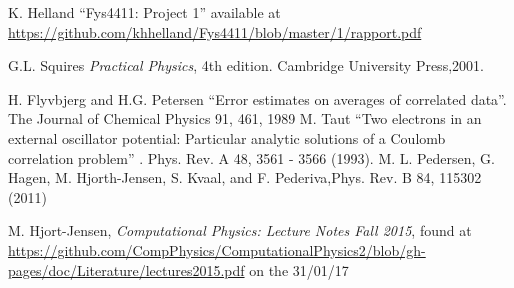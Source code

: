 \documentclass[a4paper,English,10pt]{article}
\begin{document}
\begin{thebibliography}{1}

  K. Helland ``Fys4411: Project 1'' available at \url{https://github.com/khhelland/Fys4411/blob/master/1/rapport.pdf}
  
  G.L. Squires \emph{Practical Physics}, 4th edition. Cambridge University Press,2001.
  
  H. Flyvbjerg and H.G. Petersen ``Error estimates on averages of correlated data''. The Journal of Chemical Physics 91, 461, 1989
  M. Taut ``Two electrons in an external oscillator potential: Particular analytic solutions
of a Coulomb correlation problem'' .  Phys. Rev. A 48, 3561 - 3566 (1993).
  M. L. Pedersen, G. Hagen, M. Hjorth-Jensen, S. Kvaal, and F. Pederiva,Phys. Rev. B 84, 115302 (2011)

  M. Hjort-Jensen, \emph{Computational Physics: Lecture Notes Fall 2015}, found at
  \url{https://github.com/CompPhysics/ComputationalPhysics2/blob/gh-pages/doc/Literature/lectures2015.pdf}
  on the 31/01/17
\end{thebibliography}


      
      




\end{document}
